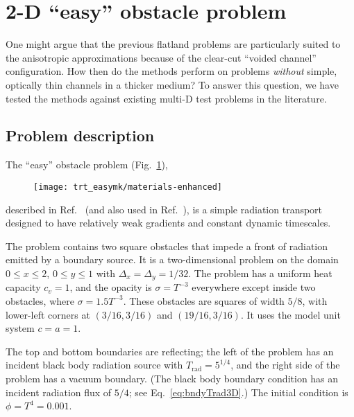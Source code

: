 
\section{2-D \texorpdfstring{``easy''}{easy} obstacle problem}

One might argue that the previous flatland problems are particularly suited to
the
anisotropic approximations because of the clear-cut ``voided channel''
configuration. How then do the methods perform on problems
\emph{without} simple, optically thin channels in a thicker medium? To answer this
question, we have tested the methods against existing multi-D test problems in
the literature.

\subsection{Problem description}

The ``easy'' obstacle problem (Fig.~\ref{fig:easymkMaterials}),
%
\begin{figure}[htb]
  \centering
  \texttt{[image: trt\_easymk/materials-enhanced]}
  \label{fig:easymkMaterials}
\end{figure}
%
described in Ref.~\cite{Mou2006} (and also used in
Ref.~\cite{Kno2007}), is a simple radiation transport designed to have
relatively weak gradients and constant dynamic timescales.

The problem contains two square obstacles that impede a front of
radiation emitted by a boundary source. It is a
two-dimensional problem on the domain $0 \le x \le 2$, $0 \le y \le 1$ with
$\Delta_x=\Delta_y=1/32$. The
problem has a uniform heat capacity $c_v = 1$, and the opacity is
$\sigma=T^{-3}$ everywhere except inside two obstacles, where $\sigma= 1.5
T^{-3}$. These obstacles are squares of width $5/8$, with lower-left corners
at $(3/16, 3/16)$ and $(19/16, 3/16)$. It uses the model unit system $c=a=1$.

The top and bottom boundaries are reflecting; the left of the problem has an
incident black body radiation source with $T_\text{rad} = 5^{1/4}$, and the right
side of the problem has a vacuum boundary. (The black body boundary condition
has an incident radiation flux of $5/4$; see Eq.~\eqref{eq:bndyTrad3D}.) The
initial condition is $\phi = T^{4} = 0.001$.

